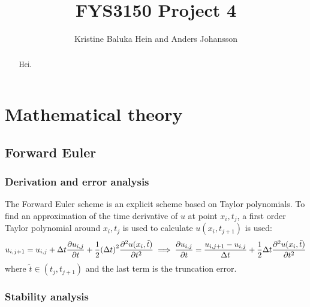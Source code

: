 \documentclass[12pt,english,a4paper]{article}
\title{FYS3150 Project 4}
\author{Kristine Baluka Hein and Anders Johansson}
\begin{document}

\pagestyle{fancy}
\tableofcontents

\begin{abstract}
Hei.
\end{abstract}
\clearpage

\section{Mathematical theory}


%
\subsection{Forward Euler}

\subsubsection{Derivation and error analysis}
The Forward Euler scheme is an explicit scheme based on Taylor polynomials. To find an approximation of the time derivative of \(u\) at point \(x_i,t_j\), a first order Taylor polynomial around \(x_i,t_j\) is used to calculate \(u(x_i,t_{j+1})\) is used:
\[
u_{i,j+1} = u_{i,j} + \Delta t\pdv{u_{i,j}}{t} + \frac{1}{2}\qty(\Delta t)^2\pdv[2]{u(x_i,\tilde{t})}{t} \implies \pdv{u_{i,j}}{t} = \frac{u_{i,j+1}-u_{i,j}}{\Delta t} + \frac{1}{2}\Delta t\pdv[2]{u(x_i,\tilde{t})}{t}
\]
where \(\tilde{t}\in(t_j,t_{j+1})\) and the last term is the truncation error.

\subsubsection{Stability analysis}



%
\end{document}

